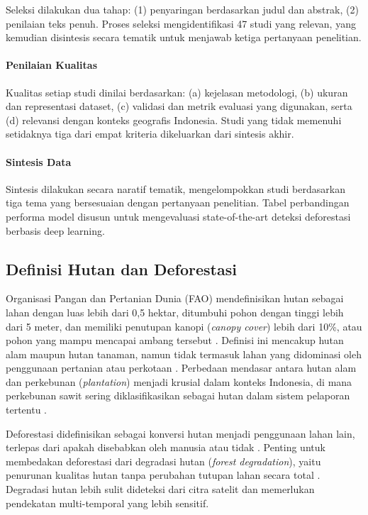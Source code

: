 \documentclass[12pt,a4paper]{article}
\begin{document}
Seleksi dilakukan dua tahap: (1) penyaringan berdasarkan judul
dan abstrak, (2) penilaian teks penuh. Proses seleksi
mengidentifikasi 47 studi yang relevan, yang kemudian
disintesis secara tematik untuk menjawab ketiga pertanyaan
penelitian.

\paragraph{Penilaian Kualitas}
Kualitas setiap studi dinilai berdasarkan: (a) kejelasan
metodologi, (b) ukuran dan representasi dataset, (c) validasi
dan metrik evaluasi yang digunakan, serta (d) relevansi dengan
konteks geografis Indonesia. Studi yang tidak memenuhi setidaknya
tiga dari empat kriteria dikeluarkan dari sintesis akhir.

\paragraph{Sintesis Data}
Sintesis dilakukan secara naratif tematik, mengelompokkan studi
berdasarkan tiga tema yang bersesuaian dengan pertanyaan
penelitian. Tabel perbandingan performa model disusun untuk
mengevaluasi state-of-the-art deteksi deforestasi berbasis
deep learning.

\subsection{Definisi Hutan dan Deforestasi}
\label{subsec:definisi}

Organisasi Pangan dan Pertanian Dunia (FAO) mendefinisikan hutan sebagai lahan
dengan luas lebih dari 0,5 hektar, ditumbuhi pohon dengan tinggi lebih dari 5 meter,
dan memiliki penutupan kanopi (\textit{canopy cover}) lebih dari 10\%, atau pohon
yang mampu mencapai ambang tersebut \cite{fao2020fra}. Definisi ini mencakup hutan
alam maupun hutan tanaman, namun tidak termasuk lahan yang didominasi oleh
penggunaan pertanian atau perkotaan \cite{chazdon2008beyond}. Perbedaan mendasar
antara hutan alam dan perkebunan (\textit{plantation}) menjadi krusial dalam
konteks Indonesia, di mana perkebunan sawit sering diklasifikasikan sebagai hutan
dalam sistem pelaporan tertentu \cite{margono2014primary}.

Deforestasi didefinisikan sebagai konversi hutan menjadi penggunaan lahan lain,
terlepas dari apakah disebabkan oleh manusia atau tidak \cite{fao2025terms}.
Penting untuk membedakan deforestasi dari degradasi hutan (\textit{forest
degradation}), yaitu penurunan kualitas hutan tanpa perubahan tutupan lahan
secara total \cite{chazdon2008beyond}. Degradasi hutan lebih sulit dideteksi
dari citra satelit dan memerlukan pendekatan multi-temporal yang lebih sensitif.
\end{document}

